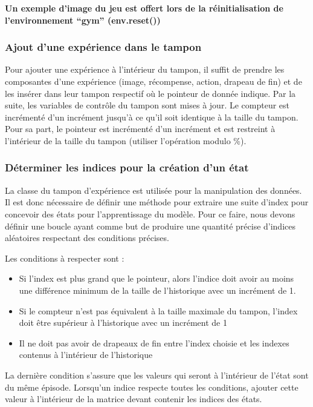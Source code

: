 \documentclass{article}
\begin{document}
\textbf{Un exemple d'image du jeu est offert lors de la réinitialisation de l'environnement ``gym'' (env.reset())}

\subsubsection{Ajout d'une expérience dans le tampon}
Pour ajouter une expérience à l'intérieur du tampon, il suffit de prendre les composantes d'une expérience (image, récompense, action, drapeau de fin) et de les insérer dans leur tampon respectif où le pointeur de donnée indique. Par la suite, les variables de contrôle du tampon sont mises à jour. Le compteur est incrémenté d'un incrément jusqu'à ce qu'il soit identique à la taille du tampon. Pour sa part, le pointeur est incrémenté d'un incrément et est restreint à l'intérieur de la taille du tampon (utiliser l'opération modulo \%).

\subsubsection{Déterminer les indices pour la création d'un état}
La classe du tampon d'expérience est utilisée pour la manipulation des données. Il est donc nécessaire de définir une méthode pour extraire une suite d'index pour concevoir des états pour l'apprentissage du modèle. Pour ce faire, nous devons définir une boucle ayant comme but de produire une quantité précise d'indices aléatoires respectant des conditions précises.

\bigbreak
Les conditions à respecter sont :
\begin{itemize}
  \item Si l'index est plus grand que le pointeur, alors l'indice doit avoir au moins une différence minimum de la taille de l'historique avec un incrément de 1.
  \item Si le compteur n'est pas équivalent à la taille maximale du tampon, l'index doit être supérieur à l'historique avec un incrément de 1
  \item Il ne doit pas avoir de drapeaux de fin entre l'index choisie et les indexes contenus à l'intérieur de l'historique
\end{itemize}

\bigbreak
La dernière condition s'assure que les valeurs qui seront à l'intérieur de l'état sont du même épisode. Lorsqu'un indice respecte toutes les conditions, ajouter cette valeur à l'intérieur de la matrice devant contenir les indices des états.
\end{document}
